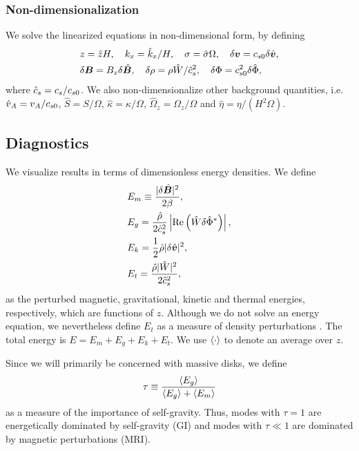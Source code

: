 \subsubsection{Non-dimensionalization}\label{non-dim}
We solve the linearized equations in non-dimensional form,
by defining
\begin{align}
  &z=\hat{z}H,\quad k_x =  \hat{k}_x/H,\quad \sigma = \hat{\sigma}\Omega,
  \quad \delta\bm{v} = c_{s0} 
  \delta\hat{\bm{v}}, \\ 
  &\delta\bm{B} = B_z\delta\hat{\bm{B}},\quad
  \delta\rho = \rho\hat{W}/\hat{c}_s^2,\quad \delta\Phi =
  c_{s0}^2\delta\hat{\Phi},  
\end{align} 
where $\hat{c}_s=c_s/c_{s0}$. We also non-dimensionalize other
background quantities, i.e. $\hat{v}_A=v_A/c_{s0}$,
$\hat{S}=S/\Omega$, $\hat{\kappa}=\kappa/\Omega$,
$\hat{\Omega}_z=\Omega_z/\Omega$ and $\hat{\eta} = \eta/(H^2\Omega)$. 


\subsection{Diagnostics}
We visualize results in terms of dimensionless energy densities. We
define 
\begin{align}
  &E_m \equiv \frac{|\delta \hat{\bm{B}}|^2}{2\beta},\\
  &E_g = 
  \frac{\hat{\rho}}{2\hat{c}_s^2}\left|\operatorname{Re}\left(\hat{W}\delta\hat{\Phi}^*\right)\right|,\\  
  &E_k = \frac{1}{2}\hat{\rho}|\delta\hat{\bm{v}}|^2,\\
  &E_t = \frac{\hat{\rho}|\hat{W}|^2}{2\hat{c}_s^2},
\end{align}
as the perturbed magnetic, gravitational, kinetic and thermal
energies, respectively, which are functions of $z$. Although we do not
solve an energy equation, we nevertheless define $E_t$ as a measure of
density perturbations \citep{kojima89}. The total energy
is $E=E_m+E_g+E_k+E_t$. We use $\langle{\cdot}\rangle$ to denote an average over
$z$. 

Since we will primarily be concerned with massive disks, we define
\begin{align}
 \tau \equiv \frac{\langle{E_g}\rangle}{\langle{E_g}\rangle + \langle{E_m}\rangle} 
\end{align} 
as a measure of the importance of self-gravity. Thus, modes with $\tau
= 1$ are energetically dominated by self-gravity (GI) and modes with
$\tau\ll1$ are dominated by magnetic perturbations (MRI).   

 
